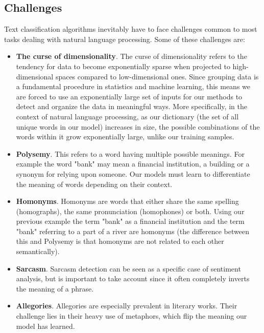 \documentclass{article}
\begin{document}
	\subsection{Challenges}
	Text classification algorithms inevitably have to face challenges common to most tasks dealing with natural language processing. Some of these challenges are:
	
	\begin{itemize}
		\item \textbf{The curse of dimensionality}. The curse of dimensionality refers to the tendency for data to become exponentially sparse when projected to high-dimensional spaces compared to low-dimensional ones. Since grouping data is a fundamental procedure in statistics and machine learning, this means we are forced to use an exponentially large set of inputs for our methods to detect and organize the data in meaningful ways. More specifically, in the context of natural language processing, as our dictionary (the set of all unique words in our model) increases in size, the possible combinations of the words within it grow exponentially large, unlike our training samples.
		
		\item \textbf{Polysemy}. This refers to a word having multiple possible meanings. For example the word "bank" may mean a financial institution, a building or a synonym for relying upon someone. Our models must learn to differentiate the meaning of words depending on their context.
		
		\item \textbf{Homonyms}. Homonyms are words that either share the same spelling (homographs), the same pronunciation (homophones) or both. Using our previous example the term "bank" as a financial institution and the term "bank" referring to a part of a river are homonyms (the difference between this and Polysemy is that homonyms are not related to each other semantically).
		
		\item \textbf{Sarcasm}. Sarcasm detection can be seen as a specific case of sentiment analysis, but is important to take account since it often completely inverts the meaning of a phrase. %
		
		\item \textbf{Allegories}. Allegories are especially prevalent in literary works. Their challenge lies in their heavy use of metaphors, which flip the meaning our model has learned.
	\end{itemize}
	
\end{document}
